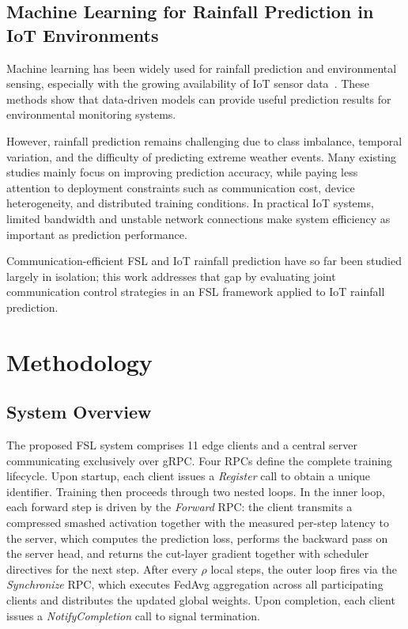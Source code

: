 \documentclass[conference]{IEEEtran}
\begin{document}
\subsection{Machine Learning for Rainfall Prediction in IoT Environments}

Machine learning has been widely used for rainfall prediction and environmental sensing, especially with the growing availability of IoT sensor data~\cite{saeed2021rainfall}. These methods show that data-driven models can provide useful prediction results for environmental monitoring systems.

However, rainfall prediction remains challenging due to class imbalance, temporal variation, and the difficulty of predicting extreme weather events. Many existing studies mainly focus on improving prediction accuracy, while paying less attention to deployment constraints such as communication cost, device heterogeneity, and distributed training conditions. In practical IoT systems, limited bandwidth and unstable network connections make system efficiency as important as prediction performance.

Communication-efficient FSL and IoT rainfall prediction have so far been studied largely in isolation; this work addresses that gap by evaluating joint communication control strategies in an FSL framework applied to IoT rainfall prediction.
 
\section{Methodology}
\label{sec:Methodology}

\subsection{System Overview}
\label{subsec:overview}

The proposed FSL system comprises 11 edge clients and a central server communicating exclusively over gRPC. Four RPCs define the complete training lifecycle. Upon startup, each client issues a \textit{Register} call to obtain a unique identifier. Training then proceeds through two nested loops. In the inner loop, each forward step is driven by the \textit{Forward} RPC: the client transmits a compressed smashed activation together with the measured per-step latency to the server, which computes the prediction loss, performs the backward pass on the server head, and returns the cut-layer gradient together with scheduler directives for the next step. After every $\rho$ local steps, the outer loop fires via the \textit{Synchronize} RPC, which executes FedAvg aggregation across all participating clients and distributes the updated global weights. Upon completion, each client issues a \textit{NotifyCompletion} call to signal termination.
\end{document}
